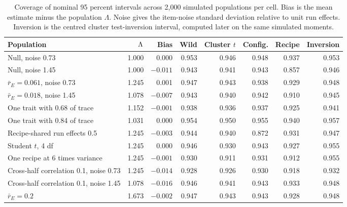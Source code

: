 \begin{table}[!htb]
\centering
\caption{Coverage of nominal 95 percent intervals across 2,000 simulated populations per cell. Bias is the mean estimate minus the population $\Lambda$. Noise gives the item-noise standard deviation relative to unit run effects. Inversion is the centred cluster test-inversion interval, computed later on the same simulated moments.}
\label{tab:coverage}
\small\setlength{\tabcolsep}{4pt}\renewcommand{\arraystretch}{1.1}
\begin{tabular}{lrrrrrrr}
\toprule
Population & $\Lambda$ & Bias & Wild & Cluster $t$ & Config. & Recipe & Inversion\\
\midrule
Null, noise 0.73 & 1.000 & 0.000 & 0.953 & 0.946 & 0.948 & 0.937 & 0.953\\
Null, noise 1.45 & 1.000 & $-0.011$ & 0.943 & 0.941 & 0.943 & 0.857 & 0.946\\
$\bar r_E=0.061$, noise 0.73 & 1.245 & 0.001 & 0.947 & 0.943 & 0.938 & 0.929 & 0.948\\
$\bar r_E=0.018$, noise 1.45 & 1.078 & $-0.007$ & 0.943 & 0.940 & 0.942 & 0.910 & 0.945\\
One trait with 0.68 of trace & 1.152 & $-0.001$ & 0.938 & 0.936 & 0.937 & 0.925 & 0.941\\
One trait with 0.84 of trace & 1.031 & 0.000 & 0.954 & 0.950 & 0.955 & 0.940 & 0.957\\
Recipe-shared run effects 0.5 & 1.245 & $-0.003$ & 0.944 & 0.940 & 0.872 & 0.931 & 0.947\\
Student $t$, 4 df & 1.245 & 0.000 & 0.946 & 0.930 & 0.943 & 0.927 & 0.955\\
One recipe at 6 times variance & 1.245 & $-0.001$ & 0.930 & 0.911 & 0.931 & 0.912 & 0.955\\
Cross-half correlation 0.1, noise 0.73 & 1.245 & $-0.014$ & 0.928 & 0.926 & 0.930 & 0.918 & 0.932\\
Cross-half correlation 0.1, noise 1.45 & 1.078 & $-0.016$ & 0.946 & 0.941 & 0.943 & 0.933 & 0.948\\
$\bar r_E=0.2$ & 1.673 & $-0.002$ & 0.947 & 0.943 & 0.943 & 0.928 & 0.948\\
\bottomrule
\end{tabular}
\end{table}

